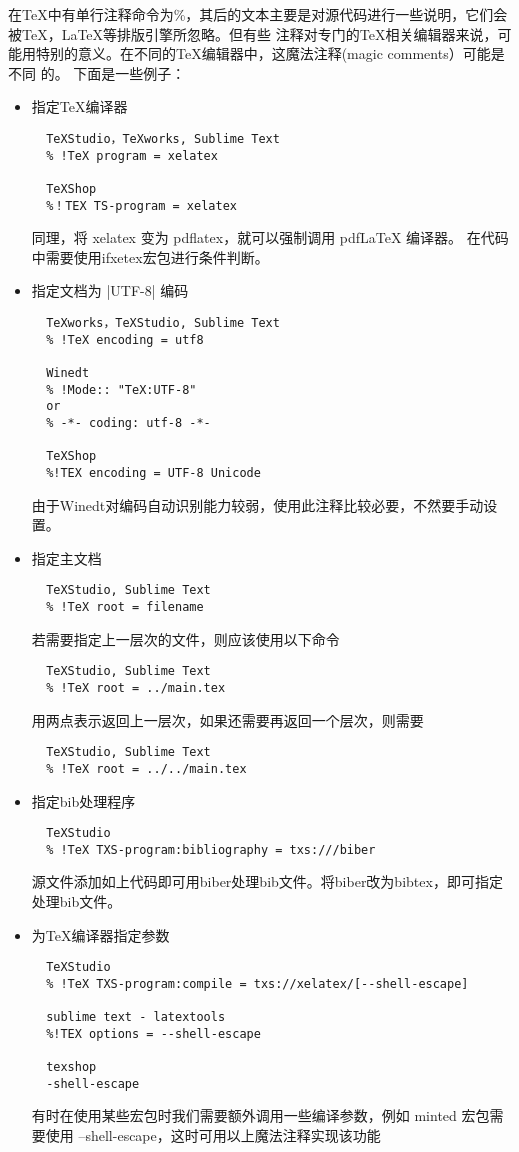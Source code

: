 在TeX中有单行注释命令为\%，其后的文本主要是对源代码进行一些说明，它们会被TeX，LaTeX等排版引擎所忽略。但有些
注释对专门的TeX相关编辑器来说，可能用特别的意义。在不同的TeX编辑器中，这魔法注释(magic comments）可能是不同
的。 下面是一些例子：
\begin{itemize}
  \item 指定\TeX{}编译器
  \begin{verbatim}
  TeXStudio，TeXworks, Sublime Text
  % !TeX program = xelatex
  
  TeXShop
  %！TEX TS-program = xelatex
  \end{verbatim}
  同理，将 xelatex 变为 pdflatex，就可以强制调用 pdfLaTeX 编译器。
  在代码中需要使用ifxetex宏包进行条件判断。 
  \item 指定文档为 |UTF-8| 编码
  \begin{verbatim}
  TeXworks，TeXStudio, Sublime Text
  % !TeX encoding = utf8
  
  Winedt
  % !Mode:: "TeX:UTF-8"
  or
  % -*- coding: utf-8 -*-
  
  TeXShop
  %!TEX encoding = UTF-8 Unicode
  \end{verbatim}
  由于Winedt对编码自动识别能力较弱，使用此注释比较必要，不然要手动设置。
  \item 指定主文档
  \begin{verbatim}
  TeXStudio, Sublime Text
  % !TeX root = filename
  \end{verbatim}
  若需要指定上一层次的文件，则应该使用以下命令
  \begin{verbatim}
  TeXStudio, Sublime Text
  % !TeX root = ../main.tex
  \end{verbatim}
  用两点表示返回上一层次，如果还需要再返回一个层次，则需要
  \begin{verbatim}
  TeXStudio, Sublime Text
  % !TeX root = ../../main.tex
  \end{verbatim}
  \item 指定bib处理程序
  \begin{verbatim}
  TeXStudio
  % !TeX TXS-program:bibliography = txs:///biber
  \end{verbatim}
  源文件添加如上代码即可用biber处理bib文件。将biber改为bibtex，即可指定\BibTeX{}处理bib文件。
  \item 
  为\TeX{}编译器指定参数
  \begin{verbatim}
  TeXStudio
  % !TeX TXS-program:compile = txs://xelatex/[--shell-escape]
  
  sublime text - latextools
  %!TEX options = --shell-escape
  
  texshop
  -shell-escape
  \end{verbatim}
  有时在使用某些宏包时我们需要额外调用一些编译参数，例如 minted 宏包需要使用 --shell-escape，这时可用以上魔法注释实现该功能
\end{itemize}

